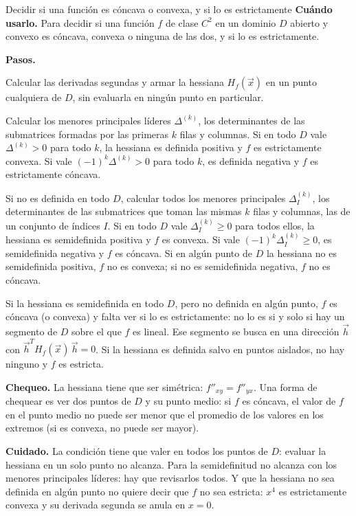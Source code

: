 \documentclass{article}
\newcommand{\rotulo}[2][principal]{\textsf{\bfseries\color{#1}#2}\enspace}
\newcommand{\vect}[1]{\vec{#1}}
\begin{document}
\begin{metodo}[label=met:concavidad]{Decidir si una función es cóncava o convexa, y si lo es estrictamente}
\rotulo{Cuándo usarlo.} Para decidir si una función \(f\) de clase \(C^2\) en un dominio \(D\) abierto y convexo es cóncava, convexa o ninguna de las dos, y si lo es estrictamente.

\rotulo{Pasos.}
\begin{pasos}
  \item Calcular las derivadas segundas y armar la hessiana \(H_f(\vect{x})\) en un punto cualquiera de \(D\), sin evaluarla en ningún punto en particular.
  \item Calcular los menores principales líderes \(\Delta^{(k)}\), los determinantes de las submatrices formadas por las primeras \(k\) filas y columnas. Si en todo \(D\) vale \(\Delta^{(k)}>0\) para todo \(k\), la hessiana es definida positiva y \(f\) es estrictamente convexa. Si vale \((-1)^k\Delta^{(k)}>0\) para todo \(k\), es definida negativa y \(f\) es estrictamente cóncava.
  \item Si no es definida en todo \(D\), calcular todos los menores principales \(\Delta^{(k)}_I\), los determinantes de las submatrices que toman las mismas \(k\) filas y columnas, las de un conjunto de índices \(I\). Si en todo \(D\) vale \(\Delta^{(k)}_I\ge0\) para todos ellos, la hessiana es semidefinida positiva y \(f\) es convexa. Si vale \((-1)^k\Delta^{(k)}_I\ge0\), es semidefinida negativa y \(f\) es cóncava. Si en algún punto de \(D\) la hessiana no es semidefinida positiva, \(f\) no es convexa; si no es semidefinida negativa, \(f\) no es cóncava.
  \item Si la hessiana es semidefinida en todo \(D\), pero no definida en algún punto, \(f\) es cóncava (o convexa) y falta ver si lo es estrictamente: no lo es si y solo si hay un segmento de \(D\) sobre el que \(f\) es lineal. Ese segmento se busca en una dirección \(\vect{h}\) con \(\vect{h}^{T}H_f(\vect{x})\,\vect{h}=0\). Si la hessiana es definida salvo en puntos aislados, no hay ninguno y \(f\) es estricta.
\end{pasos}

\rotulo{Chequeo.} La hessiana tiene que ser simétrica: \(f''_{xy}=f''_{yx}\). Una forma de chequear es ver dos puntos de \(D\) y su punto medio: si \(f\) es cóncava, el valor de \(f\) en el punto medio no puede ser menor que el promedio de los valores en los extremos (si es convexa, no puede ser mayor).

\rotulo[oxido]{Cuidado.} La condición tiene que valer en todos los puntos de \(D\): evaluar la hessiana en un solo punto no alcanza. Para la semidefinitud no alcanza con los menores principales líderes: hay que revisarlos todos. Y que la hessiana no sea definida en algún punto no quiere decir que \(f\) no sea estricta: \(x^4\) es estrictamente convexa y su derivada segunda se anula en \(x=0\).
\end{metodo}
\end{document}
